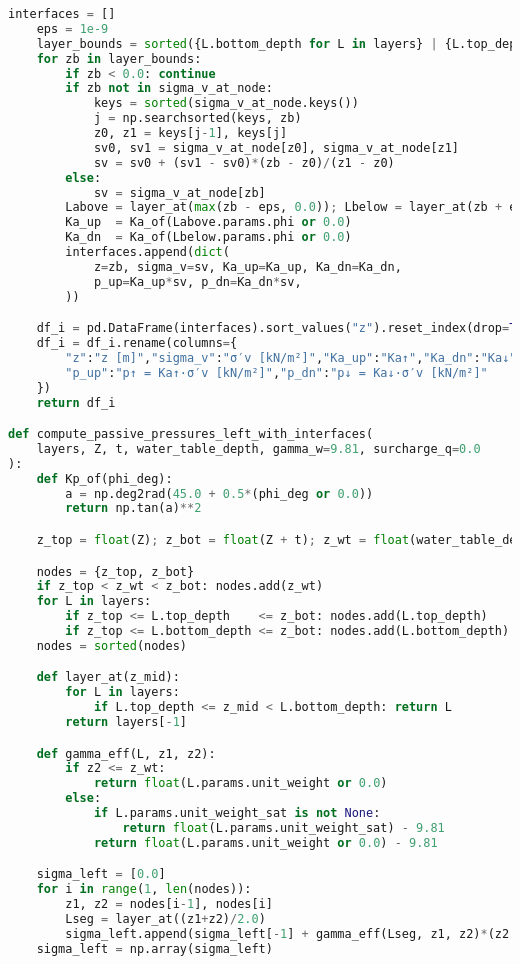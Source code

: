 \begin{lstlisting}[language=Python]
    interfaces = []
    eps = 1e-9
    layer_bounds = sorted({L.bottom_depth for L in layers} | {L.top_depth for L in layers} | {0.0, float(water_table_depth)})
    for zb in layer_bounds:
        if zb < 0.0: continue
        if zb not in sigma_v_at_node:
            keys = sorted(sigma_v_at_node.keys())
            j = np.searchsorted(keys, zb)
            z0, z1 = keys[j-1], keys[j]
            sv0, sv1 = sigma_v_at_node[z0], sigma_v_at_node[z1]
            sv = sv0 + (sv1 - sv0)*(zb - z0)/(z1 - z0)
        else:
            sv = sigma_v_at_node[zb]
        Labove = layer_at(max(zb - eps, 0.0)); Lbelow = layer_at(zb + eps)
        Ka_up  = Ka_of(Labove.params.phi or 0.0)
        Ka_dn  = Ka_of(Lbelow.params.phi or 0.0)
        interfaces.append(dict(
            z=zb, sigma_v=sv, Ka_up=Ka_up, Ka_dn=Ka_dn,
            p_up=Ka_up*sv, p_dn=Ka_dn*sv,
        ))

    df_i = pd.DataFrame(interfaces).sort_values("z").reset_index(drop=True)
    df_i = df_i.rename(columns={
        "z":"z [m]","sigma_v":"σ′v [kN/m²]","Ka_up":"Ka↑","Ka_dn":"Ka↓",
        "p_up":"p↑ = Ka↑·σ′v [kN/m²]","p_dn":"p↓ = Ka↓·σ′v [kN/m²]"
    })
    return df_i

def compute_passive_pressures_left_with_interfaces(
    layers, Z, t, water_table_depth, gamma_w=9.81, surcharge_q=0.0
):
    def Kp_of(phi_deg):
        a = np.deg2rad(45.0 + 0.5*(phi_deg or 0.0))
        return np.tan(a)**2

    z_top = float(Z); z_bot = float(Z + t); z_wt = float(water_table_depth)

    nodes = {z_top, z_bot}
    if z_top < z_wt < z_bot: nodes.add(z_wt)
    for L in layers:
        if z_top <= L.top_depth    <= z_bot: nodes.add(L.top_depth)
        if z_top <= L.bottom_depth <= z_bot: nodes.add(L.bottom_depth)
    nodes = sorted(nodes)

    def layer_at(z_mid):
        for L in layers:
            if L.top_depth <= z_mid < L.bottom_depth: return L
        return layers[-1]

    def gamma_eff(L, z1, z2):
        if z2 <= z_wt:
            return float(L.params.unit_weight or 0.0)
        else:
            if L.params.unit_weight_sat is not None:
                return float(L.params.unit_weight_sat) - 9.81
            return float(L.params.unit_weight or 0.0) - 9.81

    sigma_left = [0.0]
    for i in range(1, len(nodes)):
        z1, z2 = nodes[i-1], nodes[i]
        Lseg = layer_at((z1+z2)/2.0)
        sigma_left.append(sigma_left[-1] + gamma_eff(Lseg, z1, z2)*(z2 - z1))
    sigma_left = np.array(sigma_left)


\end{lstlisting}
